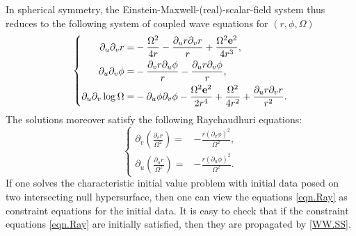 \documentclass[10pt, reqno]{amsart}
\theoremstyle{definition}
\theoremstyle{remark}
\numberwithin{equation}{section}
\newcommand{\rd}{\partial}
\newcommand{\0}{\emptyset}
\newcommand{\Omg}{\Omega}
\newcommand{\f}{\frac}
\begin{document}
In spherical symmetry, the Einstein-Maxwell-(real)-scalar-field system thus reduces to the following system of coupled wave equations for $(r,\phi,\Omega)$
\begin{equation}\label{WW.SS}
\left\{
\begin{aligned}
\rd_u\rd_v r=&-\f {\Omg^2}{4 r}-\f{\rd_u r\rd_v r}{r}+\f{\Omg^2 {\bf e}^2}{4r^3},\\
\rd_u\rd_v \phi=&-\f{\rd_v r\rd_u\phi}{r}-\f{\rd_u r\rd_v\phi}{r},\\
\rd_u\rd_v\log\Omg=&-\rd_u\phi\rd_v\phi-\f {\Omg^2 {\bf e}^2}{2 r^4}+\f{\Omg^2}{4r^2}+\f{\rd_u r\rd_v r}{r^2}.
\end{aligned}
\right.
\end{equation}
The solutions moreover satisfy the following Raychaudhuri equations:
\begin{equation}\label{eqn.Ray}
\left\{
\begin{aligned}
\rd_v\left(\f{\rd_v r}{\Omg^2}\right)=&-\f{r(\rd_v\phi)^2}{\Omg^2},\\
\rd_u\left(\f{\rd_u r}{\Omg^2}\right)=&-\f{r(\rd_u\phi)^2}{\Omg^2}.
\end{aligned}
\right.
\end{equation}
If one solves the characteristic initial value problem with initial data posed on two intersecting null hypersurface, then one can view the equations \eqref{eqn.Ray} as constraint equations for the initial data. It is easy to check that if the constraint equations \eqref{eqn.Ray} are initially satisfied, then they are propagated by \eqref{WW.SS}.
\end{document}
